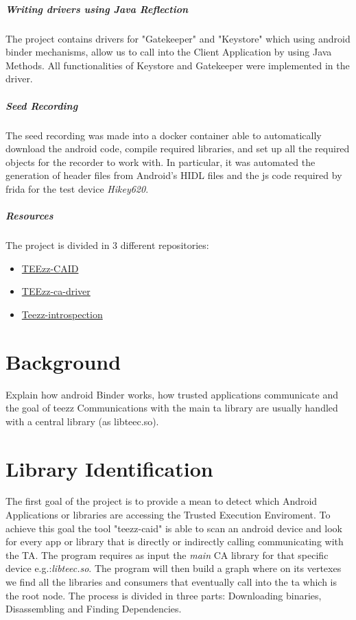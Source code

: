 \documentclass[a4paper,11pt,oneside]{report}
\begin{document}
\paragraph{Writing drivers using Java Reflection}
The project contains drivers for "Gatekeeper" and "Keystore" which using android
binder mechanisms, allow us to call into the Client Application by using Java
Methods. All functionalities of Keystore and Gatekeeper were implemented in the driver.
\paragraph{Seed Recording}
The seed recording was made into a docker container able to automatically
download the android code, compile required libraries, and set up all the
required objects for the recorder to work with. In particular, it was automated
the generation of header files from Android's HIDL files and the js code required
by frida for the test device \emph{Hikey620}.
\paragraph{Resources}
The project is divided in 3 different repositories:
\begin{itemize}
  \item \href{https://github.com/HexHive/teezz-caid}{TEEzz-CAID}
  \item \href{https://github.com/HexHive/teezz-ca-driver}{TEEzz-ca-driver}
  \item \href{https://github.com/HexHive/teezz-introspection}{Teezz-introspection}
\end{itemize}

\chapter{Background}

Explain how android Binder works, how trusted applications communicate and
the goal of teezz
Communications with the main ta
library are usually handled with a central library (as libteec.so).
\chapter{Library Identification}
The first goal of the project is to provide a mean to detect which Android
Applications or libraries are accessing the Trusted Execution Enviroment.
To achieve this goal the tool "teezz-caid" is able to
scan an android device and look for every app or library that is directly or
indirectly calling communicating with the TA. The program requires as input
the \emph{main} CA library for that specific device e.g.:\emph{libteec.so}.
The program will then build a graph where on its vertexes we find all the
libraries and consumers that eventually call into the ta which is the root node.
The process is divided in three parts:
Downloading binaries, Disassembling and Finding Dependencies.
\end{document}
